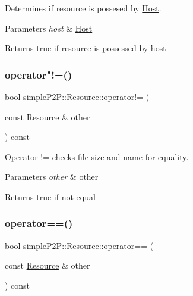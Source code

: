 Determines if resource is possesed by \hyperlink{classsimpleP2P_1_1Host}{Host}. 


\begin{DoxyParams}{Parameters}
{\em host} & \hyperlink{classsimpleP2P_1_1Host}{Host} \\
\hline
\end{DoxyParams}
\begin{DoxyReturn}{Returns}
true if resource is possessed by host 
\end{DoxyReturn}
\mbox{\label{classsimpleP2P_1_1Resource_a5694c4c5a3d5b303a1fa0dcb3fb478b1}} 
\subsubsection{\texorpdfstring{operator"!=()}{operator!=()}}
{\footnotesize\ttfamily bool simple\+P2\+P\+::\+Resource\+::operator!= (\begin{DoxyParamCaption}\item[{const \hyperlink{classsimpleP2P_1_1Resource}{Resource} \&}]{other }\end{DoxyParamCaption}) const}



Operator != checks file size and name for equality. 


\begin{DoxyParams}{Parameters}
{\em other} & other \\
\hline
\end{DoxyParams}
\begin{DoxyReturn}{Returns}
true if not equal 
\end{DoxyReturn}
\mbox{\label{classsimpleP2P_1_1Resource_a0b42735bed5ab425b9e26b660ededecf}} 
\subsubsection{\texorpdfstring{operator==()}{operator==()}}
{\footnotesize\ttfamily bool simple\+P2\+P\+::\+Resource\+::operator== (\begin{DoxyParamCaption}\item[{const \hyperlink{classsimpleP2P_1_1Resource}{Resource} \&}]{other }\end{DoxyParamCaption}) const}



